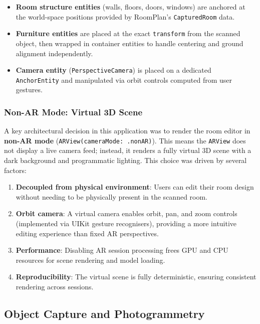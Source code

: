 \begin{itemize}
    \item \textbf{Room structure entities} (walls, floors, doors, windows) are anchored at the world-space positions provided by RoomPlan's \texttt{CapturedRoom} data.
    \item \textbf{Furniture entities} are placed at the exact \texttt{transform} from the scanned object, then wrapped in container entities to handle centering and ground alignment independently.
    \item \textbf{Camera entity} (\texttt{PerspectiveCamera}) is placed on a dedicated \texttt{AnchorEntity} and manipulated via orbit controls computed from user gestures.
\end{itemize}

\subsubsection{Non-AR Mode: Virtual 3D Scene}

A key architectural decision in this application was to render the room editor in \textbf{non-AR mode} (\texttt{ARView(cameraMode: .nonAR)}). This means the \texttt{ARView} does not display a live camera feed; instead, it renders a fully virtual 3D scene with a dark background and programmatic lighting. This choice was driven by several factors:

\begin{enumerate}
    \item \textbf{Decoupled from physical environment}: Users can edit their room design without needing to be physically present in the scanned room.
    \item \textbf{Orbit camera}: A virtual camera enables orbit, pan, and zoom controls (implemented via UIKit gesture recognisers), providing a more intuitive editing experience than fixed AR perspectives.
    \item \textbf{Performance}: Disabling AR session processing frees GPU and CPU resources for scene rendering and model loading.
    \item \textbf{Reproducibility}: The virtual scene is fully deterministic, ensuring consistent rendering across sessions.
\end{enumerate}


\subsection{Object Capture and Photogrammetry}
\label{subsec:object_capture}

